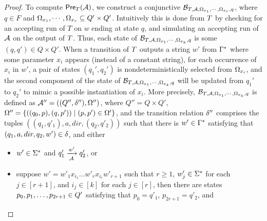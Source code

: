 \begin{proof}
To compute $\textsf{Pre}_{T}(\mathcal{A})$, we construct a conjunctive \FFA{} %
$\mathcal{B}_{T, \mathcal{A}, \Omega_{x_1}, \cdots, \Omega_{x_r}, q}$, %
%
where  $q \in F$ and  $\Omega_{x_1}, \cdots, \Omega_{x_r} \subseteq Q' \times Q'$.   
Intuitively this is done from $T$  by checking for an accepting run of $T$ on $w$ ending at state $q$, and simulating an accepting run of $\mathcal{A}$ on the output of $T$. Thus, each state of $\mathcal{B}_{T, \mathcal{A}, \Omega_{x_1}, \cdots, \Omega_{x_k}, q}$ is some $(q,q') \in Q \times Q'$. 
When a transition of $T$ outputs a string $w'$ from $\Gamma^*$ where some parameter $x_i$ appears (instead of a constant string), for each occurrence of $x_i$ in $w'$, a pair of states $(q_1', q_2')$ is nondeterministically selected from $\Omega_{x_i}$, and the second component of the state of $\mathcal{B}_{T, \mathcal{A}, \Omega_{x_1}, \cdots, \Omega_{x_k}, q}$ will be updated from $q_1'$ to $q_2'$ to mimic a possible instantiation of $x_i$.  
More precisely, $\mathcal{B}_{T, \mathcal{A}, \Omega_{x_1}, \cdots, \Omega_{x_k}, q}$ is defined as
$\mathcal{A}'' = ((Q'', \delta''), \Omega'')$, where $Q'' = Q \times Q'$, $\Omega'' = \{((q_0, p), (q, p')) \mid (p, p') \in \Omega'\}$, and the transition relation $\delta''$ comprises the tuples $((q_1, q'_1), a, dir, (q_2, q'_2))$ such that there is $w' \in \Gamma^*$ satisfying that $(q_1, a, dir, q_2, w') \in \delta$, and either
\begin{itemize}
\item $w' \in \Sigma^*$  and $q'_1 \xrightarrow[\mathcal{A}]{w'} q'_2$, or
%
\item suppose $w' = w'_1 x_{i_1} \ldots w'_{r} x_{i_{r}} w'_{r+1}$ such that $r \ge 1$, $w'_j \in \Sigma^*$ for each $j \in [r+1]$,  and $i_j \in [k]$ for each $j \in [r]$, then there are states $p_0, p_1, \ldots, p_{2r+1} \in Q'$ satisfying that $p_0 = q'_1$, $p_{2r+1} = q'_2$, and 

\end{itemize}
\end{proof}
